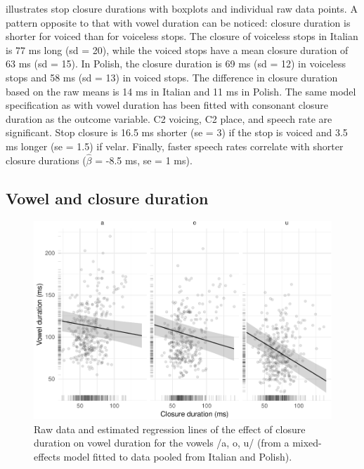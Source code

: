 \documentclass[preprint]{JASAnew}
\begin{document}
 illustrates stop closure durations with boxplots
and individual raw data points. A pattern opposite to that with vowel
duration can be noticed: closure duration is shorter for voiced than for
voiceless stops. The closure of voiceless stops in Italian is 77 ms long
(sd = 20), while the voiced stops have a mean closure duration of 63 ms
(sd = 15). In Polish, the closure duration is 69 ms (sd = 12) in
voiceless stops and 58 ms (sd = 13) in voiced stops. The difference in
closure duration based on the raw means is 14 ms in Italian and 11 ms in
Polish. The same model specification as with vowel duration has been
fitted with consonant closure duration as the outcome variable. C2
voicing, C2 place, and speech rate are significant. Stop closure is 16.5
ms shorter (se = 3) if the stop is voiced and 3.5 ms longer (se = 1.5)
if velar. Finally, faster speech rates correlate with shorter closure
durations (\(\hat{\beta}\) = -8.5 ms, se = 1 ms).

\subsection{Vowel and closure
duration}\label{vowel-and-closure-duration}

\begin{figure}
\includegraphics[width=\linewidth]{2018-jasa_files/figure-latex/Figure4-1} \caption{Raw data and estimated regression lines of the effect of closure duration on vowel duration for the vowels /a, o, u/ (from a mixed-effects model fitted to data pooled from Italian and Polish).}\label{f:Figure4}
\end{figure}
\end{document}
